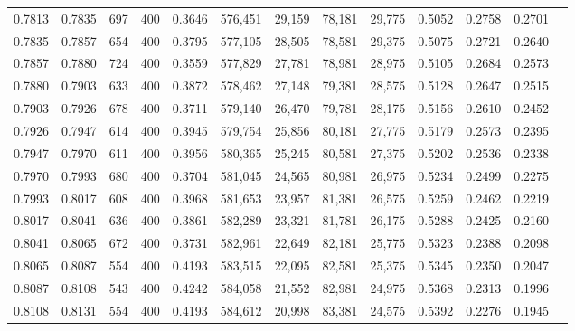 \begin{tabular}{rrrrrrrrrrrrr}
0.7813 & 0.7835 &    697 &   400 &                                     0.3646 & 576,451 &  29,159 &  78,181 &  29,775 & 0.5052 & 0.2758 & 0.2701 \\
0.7835 & 0.7857 &    654 &   400 &                                     0.3795 & 577,105 &  28,505 &  78,581 &  29,375 & 0.5075 & 0.2721 & 0.2640 \\
0.7857 & 0.7880 &    724 &   400 &                                     0.3559 & 577,829 &  27,781 &  78,981 &  28,975 & 0.5105 & 0.2684 & 0.2573 \\
0.7880 & 0.7903 &    633 &   400 &                                     0.3872 & 578,462 &  27,148 &  79,381 &  28,575 & 0.5128 & 0.2647 & 0.2515 \\
0.7903 & 0.7926 &    678 &   400 &                                     0.3711 & 579,140 &  26,470 &  79,781 &  28,175 & 0.5156 & 0.2610 & 0.2452 \\
0.7926 & 0.7947 &    614 &   400 &                                     0.3945 & 579,754 &  25,856 &  80,181 &  27,775 & 0.5179 & 0.2573 & 0.2395 \\
0.7947 & 0.7970 &    611 &   400 &                                     0.3956 & 580,365 &  25,245 &  80,581 &  27,375 & 0.5202 & 0.2536 & 0.2338 \\
0.7970 & 0.7993 &    680 &   400 &                                     0.3704 & 581,045 &  24,565 &  80,981 &  26,975 & 0.5234 & 0.2499 & 0.2275 \\
0.7993 & 0.8017 &    608 &   400 &                                     0.3968 & 581,653 &  23,957 &  81,381 &  26,575 & 0.5259 & 0.2462 & 0.2219 \\
0.8017 & 0.8041 &    636 &   400 &                                     0.3861 & 582,289 &  23,321 &  81,781 &  26,175 & 0.5288 & 0.2425 & 0.2160 \\
0.8041 & 0.8065 &    672 &   400 &                                     0.3731 & 582,961 &  22,649 &  82,181 &  25,775 & 0.5323 & 0.2388 & 0.2098 \\
0.8065 & 0.8087 &    554 &   400 &                                     0.4193 & 583,515 &  22,095 &  82,581 &  25,375 & 0.5345 & 0.2350 & 0.2047 \\
0.8087 & 0.8108 &    543 &   400 &                                     0.4242 & 584,058 &  21,552 &  82,981 &  24,975 & 0.5368 & 0.2313 & 0.1996 \\
0.8108 & 0.8131 &    554 &   400 &                                     0.4193 & 584,612 &  20,998 &  83,381 &  24,575 & 0.5392 & 0.2276 & 0.1945 \\

\end{tabular}
